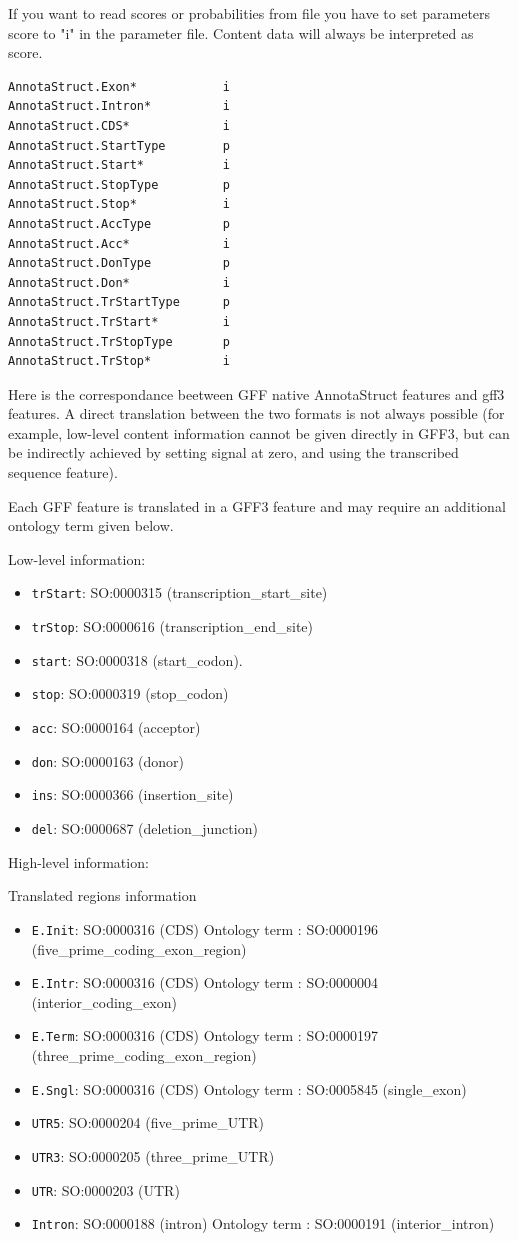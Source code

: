 If you want to read scores or probabilities from file you have to set
parameters score to "i" in the parameter file.  Content data will
always be interpreted as score.
\begin{Verbatim}[fontsize=\small]
AnnotaStruct.Exon*            i
AnnotaStruct.Intron*          i
AnnotaStruct.CDS*             i
AnnotaStruct.StartType        p 
AnnotaStruct.Start*           i
AnnotaStruct.StopType         p 
AnnotaStruct.Stop*            i
AnnotaStruct.AccType          p 
AnnotaStruct.Acc*             i
AnnotaStruct.DonType          p 
AnnotaStruct.Don*             i
AnnotaStruct.TrStartType      p 
AnnotaStruct.TrStart*         i
AnnotaStruct.TrStopType       p 
AnnotaStruct.TrStop*          i
\end{Verbatim}

Here is the correspondance beetween GFF native AnnotaStruct features
and gff3 features. A direct translation between the two formats is not
always possible (for example, low-level content information cannot be
given directly in GFF3, but  can be indirectly achieved by setting
signal at zero, and using the transcribed sequence feature).

Each GFF feature is translated in a GFF3 feature and may
require an additional ontology term given below.

Low-level information:
\begin{itemize}
\item \texttt{trStart}: 	SO:0000315 (transcription\_start\_site)
\item \texttt{trStop}: 	SO:0000616 (transcription\_end\_site)
\item \texttt{start}: 	SO:0000318 (start\_codon).
\item \texttt{stop}: 	SO:0000319 (stop\_codon)
\item \texttt{acc}: 	SO:0000164 (acceptor)
\item \texttt{don}: 	SO:0000163 (donor)
\item \texttt{ins}: 	SO:0000366 (insertion\_site)
\item \texttt{del}: 	SO:0000687 (deletion\_junction)
\end{itemize}
High-level information:

Translated regions information
\begin{itemize}
\item \texttt{E.Init}: SO:0000316 (CDS) Ontology term :	SO:0000196 (five\_prime\_coding\_exon\_region)
\item \texttt{E.Intr}: SO:0000316 (CDS) Ontology term :	SO:0000004 (interior\_coding\_exon)
\item \texttt{E.Term}: SO:0000316 (CDS) Ontology term :	SO:0000197 (three\_prime\_coding\_exon\_region)
\item \texttt{E.Sngl}: SO:0000316 (CDS) Ontology term :	SO:0005845 (single\_exon)
\item \texttt{UTR5}:   SO:0000204 (five\_prime\_UTR)
\item \texttt{UTR3}:   SO:0000205 (three\_prime\_UTR)
\item \texttt{UTR}:    SO:0000203 (UTR)
\item \texttt{Intron}: SO:0000188 (intron) Ontology term : SO:0000191	(interior\_intron)
\end{itemize}

